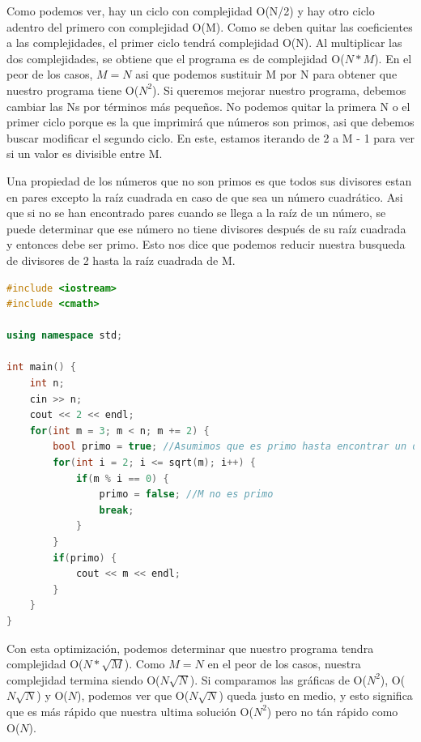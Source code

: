 \documentclass{article}
\begin{document}
Como podemos ver, hay un ciclo con complejidad O(N/2) y hay otro ciclo adentro del primero con complejidad O(M). Como se deben quitar las coeficientes a las complejidades, el primer ciclo tendrá complejidad O(N). Al multiplicar las dos complejidades, se obtiene que el programa es de complejidad O($N * M$). En el peor de los casos, $M = N$ asi que podemos sustituir M por N para obtener que nuestro programa tiene O($N^2$). Si queremos mejorar nuestro programa, debemos cambiar las Ns por términos más pequeños. No podemos quitar la primera N o el primer ciclo porque es la que imprimirá que números son primos, asi que debemos buscar modificar el segundo ciclo. En este, estamos iterando de 2 a M - 1 para ver si un valor es divisible entre M.

Una propiedad de los números que no son primos es que todos sus divisores estan en pares excepto la raíz cuadrada en caso de que sea un número cuadrático. Asi que si no se han encontrado pares cuando se llega a la raíz de un número, se puede determinar que ese número no tiene divisores después de su raíz cuadrada y entonces debe ser primo. Esto nos dice que podemos reducir nuestra busqueda de divisores de 2 hasta la raíz cuadrada de M.

\begin{lstlisting}[language=C++, caption=¿Optimizando?]
#include <iostream>
#include <cmath>

using namespace std;

int main() {
    int n;
    cin >> n;
    cout << 2 << endl;
    for(int m = 3; m < n; m += 2) {
        bool primo = true; //Asumimos que es primo hasta encontrar un divisor
        for(int i = 2; i <= sqrt(m); i++) {
            if(m % i == 0) {
                primo = false; //M no es primo
                break;
            }
        }
        if(primo) {
            cout << m << endl;
        }
    }
}
\end{lstlisting}

Con esta optimización, podemos determinar que nuestro programa tendra complejidad O($N * \sqrt{M}$). Como $M = N$ en el peor de los casos, nuestra complejidad termina siendo O($N \sqrt{N}$). Si comparamos las gráficas de O($N^2$), O($N \sqrt{N}$) y O($N$), podemos ver que O($N \sqrt{N}$) queda justo en medio, y esto significa que es más rápido que nuestra ultima solución O($N^2$) pero no tán rápido como O($N$).
\end{document}
